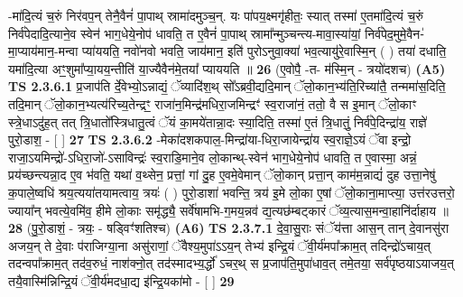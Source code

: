\documentclass[17pt]{extarticle}
\begin{document}
                  -मा॑दि॒त्यं च॒रुं निर॑वप॒न् तेनै॒वैनं॑ पा॒पाथ् स्रामा॑दमुञ्च॒न्. यः पा॑पय॒क्ष्मगृ॑हीतः॒ स्यात् तस्मा॑ ए॒तमा॑दि॒त्यं च॒रुं निर्व॑पेदादि॒त्याने॒व स्वेन॑ भाग॒धेये॒नोप॑ धावति॒ त ए॒वैनं॑ पा॒पाथ् स्रामा᳚न्मुञ्चन्त्य-मावा॒स्या॑यां॒ निर्व॑पेद॒मुमे॒वैन-॑मा॒प्याय॑मान॒-मन्वा प्या॑ययति॒ नवो॑नवो भवति॒ जाय॑मान॒ इति॑ पुरोऽनुवा॒क्या॑ भव॒त्यायु॑रे॒वास्मि॒न् ( ) तया॑ दधाति॒ यमा॑दि॒त्या अꣳ॒॒शुमा᳚प्या॒यय॒न्तीति॑ या॒ज्यैवैन॑मे॒तया᳚ प्याययति ॥ \textbf{  26} \newline
                  \newline
                      (ए॒वोपै॒ -त- म॑स्मि॒न् - त्रयो॑दशच)  \textbf{(A5)} \newline \newline
                                        \textbf{ TS 2.3.6.1} \newline
                  प्र॒जाप॑ति र्दे॒वेभ्यो॒ऽन्नाद्यं॒ ॅव्यादि॑श॒थ् सो᳚ऽब्रवी॒द्यदि॒मान् ॅलो॒कान॒भ्य॑ति॒रिच्या॑तै॒ तन्ममा॑स॒दिति॒ तदि॒मान् ॅलो॒कान॒भ्यत्य॑रिच्य॒तेन्द्रꣳ॒॒ राजा॑न॒मिन्द्र॑मधिरा॒जमिन्द्रꣳ॑ स्व॒राजा॑नं॒ ततो॒ वै स इ॒मान् ॅलो॒काꣳ स्त्रे॒धाऽदु॑ह॒त् तत् त्रि॒धातो᳚स्त्रिधातु॒त्वं ॅयं का॒मये॑तान्ना॒दः स्या॒दिति॒ तस्मा॑ ए॒तं त्रि॒धातुं॒ निर्व॑पे॒दिन्द्रा॑य॒ राज्ञे॑ पुरो॒डाश॒ - [  ] \textbf{  27} \newline
                  \newline
                                \textbf{ TS 2.3.6.2} \newline
                  -मेका॑दशकपाल॒-मिन्द्रा॑या-धिरा॒जायेन्द्रा॑य स्व॒राज्ञे॒ऽयं ॅवा इन्द्रो॒ राजा॒ऽयमिन्द्रो॑-ऽधिरा॒जो॑-ऽसाविन्द्रः॑ स्व॒राडि॒माने॒व लो॒कान्थ्-स्वेन॑ भाग॒धेये॒नोप॑ धावति॒ त ए॒वास्मा॒ अन्नं॒ प्रय॑च्छन्त्यन्ना॒द ए॒व भ॑वति॒ यथा॑ व॒थ्सेन॒ प्रत्तां॒ गां दु॒ह ए॒वमे॒वेमान् ॅलो॒कान् प्रत्ता॒न् काम॑म॒न्नाद्यं॑ दुह उत्ता॒नेषु॑ क॒पाले॒ष्वधि॑ श्रय॒त्यया॑तयामत्वाय॒ त्रयः॑ ( ) पुरो॒डाशा॑ भवन्ति॒ त्रय॑ इ॒मे लो॒का ए॒षां ॅलो॒काना॒माप्त्या॒ उत्त॑र‌उत्तरो॒ ज्याया᳚न् भवत्ये॒वमि॑व॒ हीमे लो॒काः समृ॑द्ध्यै॒ सर्वे॑षामभि-ग॒मय॒न्नव॑ द्य॒त्यछ॑म्बट्कारं ॅव्य॒त्यास॒मन्वा॒हानि॑र्दाहाय ॥ \textbf{  28} \newline
                  \newline
                      (पु॒रो॒डाशं॒ - त्रयः॒ - षड्विꣳ॑शतिश्च)  \textbf{(A6)} \newline \newline
                                        \textbf{ TS 2.3.7.1} \newline
                  दे॒वा॒सु॒राः संॅय॑त्ता आस॒न् तान् दे॒वानसु॑रा अजय॒न् ते दे॒वाः प॑राजिग्या॒ना असु॑राणां॒ ॅवैश्य॒मुपा॑ऽऽय॒न् तेभ्य॑ इन्द्रि॒यं ॅवी॒र्य॑मपा᳚क्राम॒त् तदिन्द्रो॑ऽचाय॒त् तदन्वपा᳚क्राम॒त् तद॑व॒रुधं॒ नाश॑क्नो॒त् तद॑स्मादभ्य॒र्द्धो॑ ऽचर॒थ् स प्र॒जाप॑ति॒मुपा॑धाव॒त् तमे॒तया॒ सर्व॑पृष्ठयाऽयाजय॒त् तयै॒वास्मि॑न्निन्द्रि॒यं ॅवी॒र्य॑मदधा॒द्य इ॑न्द्रि॒यका॑मो - [  ] \textbf{  29} \newline
\end{document}
